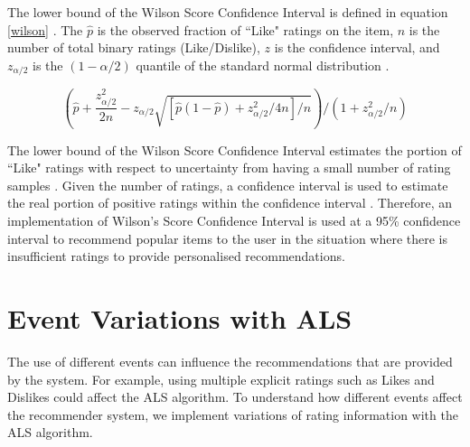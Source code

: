 The lower bound of the Wilson Score Confidence Interval is defined in equation \ref{wilson}  \cite{wilson1927probable, popularity}. The $\hat{p}$ is the observed fraction of ``Like" ratings on the item, $n$ is the number of total binary ratings (Like/Dislike), $z$ is the confidence interval, and $z_{\alpha/2}$ is the $(1-\alpha/2)$ quantile of the standard normal distribution \cite{popularity}.    

\begin{equation} \label{wilson}
\left(\hat{p} + \frac{z^2_{\alpha/2}}{2n} - z_{\alpha/2} \sqrt{[\hat{p}(1-\hat{p}) + z^2_{\alpha/2}/4n]/n}\right)/(1 + z^2_{\alpha/2}/n)
\end{equation}

The lower bound of the Wilson Score Confidence Interval estimates the portion of ``Like" ratings with respect to uncertainty from having a small number of rating samples \cite{popularity}. Given the number of ratings, a confidence interval is used to estimate the real portion of positive ratings within the confidence interval \cite{popularity}. Therefore, an implementation of Wilson's Score Confidence Interval is used at a 95\% confidence interval to recommend popular items to the user in the situation where there is insufficient ratings to provide personalised recommendations. 

\section{Event Variations with ALS} \label{algorithms}

The use of different events can influence the recommendations that are provided by the system. For example, using multiple explicit ratings such as Likes and Dislikes could affect the ALS algorithm. To understand how different events affect the recommender system, we implement variations of rating information with the ALS algorithm.

\subsubsection{}

\subsubsection{}

\subsection{}


